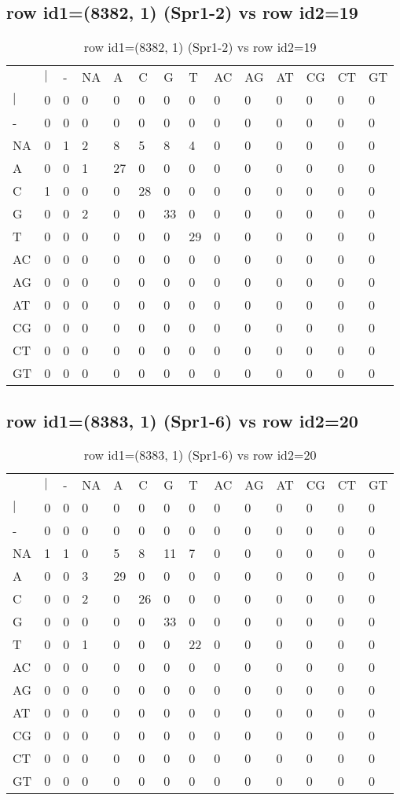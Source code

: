 \subsection{row id1=(8382, 1) (Spr1-2) vs row id2=19}
\begin{center}
\begin{longtable}{|l|l|l|l|l|l|l|l|l|l|l|l|l|l|}
\caption{row id1=(8382, 1) (Spr1-2) vs row id2=19} \label{table_dm626}\\
\hline
\\
\hline
&$|$&-&NA&A&C&G&T&AC&AG&AT&CG&CT&GT\\
$|$&0&0&0&0&0&0&0&0&0&0&0&0&0\\
-&0&0&0&0&0&0&0&0&0&0&0&0&0\\
NA&0&1&2&8&5&8&4&0&0&0&0&0&0\\
A&0&0&1&27&0&0&0&0&0&0&0&0&0\\
C&1&0&0&0&28&0&0&0&0&0&0&0&0\\
G&0&0&2&0&0&33&0&0&0&0&0&0&0\\
T&0&0&0&0&0&0&29&0&0&0&0&0&0\\
AC&0&0&0&0&0&0&0&0&0&0&0&0&0\\
AG&0&0&0&0&0&0&0&0&0&0&0&0&0\\
AT&0&0&0&0&0&0&0&0&0&0&0&0&0\\
CG&0&0&0&0&0&0&0&0&0&0&0&0&0\\
CT&0&0&0&0&0&0&0&0&0&0&0&0&0\\
GT&0&0&0&0&0&0&0&0&0&0&0&0&0\\
\hline
\end{longtable}
\end{center}

\subsection{row id1=(8383, 1) (Spr1-6) vs row id2=20}
\begin{center}
\begin{longtable}{|l|l|l|l|l|l|l|l|l|l|l|l|l|l|}
\caption{row id1=(8383, 1) (Spr1-6) vs row id2=20} \label{table_dm628}\\
\hline
\\
\hline
&$|$&-&NA&A&C&G&T&AC&AG&AT&CG&CT&GT\\
$|$&0&0&0&0&0&0&0&0&0&0&0&0&0\\
-&0&0&0&0&0&0&0&0&0&0&0&0&0\\
NA&1&1&0&5&8&11&7&0&0&0&0&0&0\\
A&0&0&3&29&0&0&0&0&0&0&0&0&0\\
C&0&0&2&0&26&0&0&0&0&0&0&0&0\\
G&0&0&0&0&0&33&0&0&0&0&0&0&0\\
T&0&0&1&0&0&0&22&0&0&0&0&0&0\\
AC&0&0&0&0&0&0&0&0&0&0&0&0&0\\
AG&0&0&0&0&0&0&0&0&0&0&0&0&0\\
AT&0&0&0&0&0&0&0&0&0&0&0&0&0\\
CG&0&0&0&0&0&0&0&0&0&0&0&0&0\\
CT&0&0&0&0&0&0&0&0&0&0&0&0&0\\
GT&0&0&0&0&0&0&0&0&0&0&0&0&0\\
\hline
\end{longtable}
\end{center}

